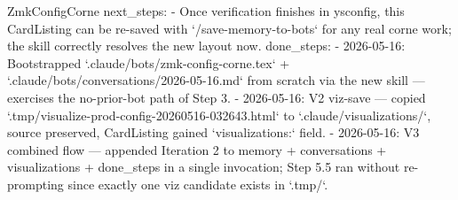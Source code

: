 \begin{cardlisting}{ZmkConfigCorne}
  next_steps:
    - Once verification finishes in ysconfig, this CardListing can be re-saved with `/save-memory-to-bots` for any real corne work; the skill correctly resolves the new layout now.
  done_steps:
    - 2026-05-16: Bootstrapped `.claude/bots/zmk-config-corne.tex` + `.claude/bots/conversations/2026-05-16.md` from scratch via the new skill — exercises the no-prior-bot path of Step 3.
    - 2026-05-16: V2 viz-save — copied `.tmp/visualize-prod-config-20260516-032643.html` to `.claude/visualizations/`, source preserved, CardListing gained `visualizations:` field.
    - 2026-05-16: V3 combined flow — appended Iteration 2 to memory + conversations + visualizations + done_steps in a single invocation; Step 5.5 ran without re-prompting since exactly one viz candidate exists in `.tmp/`.
\end{cardlisting}
